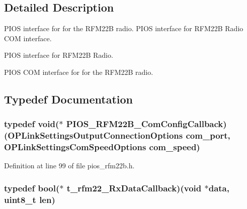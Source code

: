 \subsection{Detailed Description}
P\-I\-O\-S interface for for the R\-F\-M22\-B radio. P\-I\-O\-S interface for R\-F\-M22\-B Radio C\-O\-M interface.

P\-I\-O\-S interface for R\-F\-M22\-B Radio.

P\-I\-O\-S C\-O\-M interface for for the R\-F\-M22\-B radio.

\subsection{Typedef Documentation}
\hypertarget{group___p_i_o_s___r_f_m22_b_gaa8a316480e010f5e383d29257c0686cd}{
\subsubsection[{P\-I\-O\-S\-\_\-\-R\-F\-M22\-B\-\_\-\-Com\-Config\-Callback}]{\setlength{\rightskip}{0pt plus 5cm}typedef {\bf void}($\ast$ P\-I\-O\-S\-\_\-\-R\-F\-M22\-B\-\_\-\-Com\-Config\-Callback)(O\-P\-Link\-Settings\-Output\-Connection\-Options com\-\_\-port, O\-P\-Link\-Settings\-Com\-Speed\-Options com\-\_\-speed)}}\label{group___p_i_o_s___r_f_m22_b_gaa8a316480e010f5e383d29257c0686cd}


Definition at line 99 of file pios\-\_\-rfm22b.\-h.

\hypertarget{group___p_i_o_s___r_f_m22_b_ga6d517bc1c96f4b523eb7a289850c3bb8}{
\subsubsection[{t\-\_\-rfm22\-\_\-\-Rx\-Data\-Callback}]{\setlength{\rightskip}{0pt plus 5cm}typedef {\bf bool}($\ast$ t\-\_\-rfm22\-\_\-\-Rx\-Data\-Callback)({\bf void} $\ast${\bf data}, {\bf uint8\-\_\-t} {\bf len})}}\label{group___p_i_o_s___r_f_m22_b_ga6d517bc1c96f4b523eb7a289850c3bb8}


